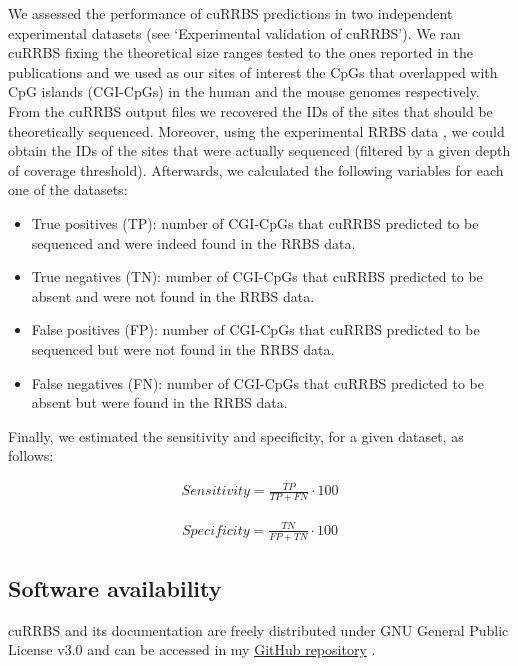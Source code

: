 We assessed the performance of cuRRBS predictions in two independent experimental datasets \cite{Tanas2017,Lim2016} (see `Experimental validation of cuRRBS'). We ran cuRRBS fixing the theoretical size ranges tested to the ones reported in the publications \cite{Tanas2017,Lim2016} and we used as our sites of interest the CpGs that overlapped with CpG islands (CGI-CpGs) in the human \cite{Tanas2017} and the mouse genomes \cite{Lim2016} respectively. From the cuRRBS output files we recovered the IDs of the sites that should be theoretically sequenced. Moreover, using the experimental RRBS data \cite{Tanas2017,Lim2016}, we could obtain the IDs of the sites that were actually sequenced (filtered by a given depth of coverage threshold). Afterwards, we calculated the following variables for each one of the datasets:

\begin{itemize}
	
	\item True positives (TP): number of CGI-CpGs that cuRRBS predicted to be sequenced and were indeed found in the RRBS data.
	
	\item True negatives (TN): number of CGI-CpGs that cuRRBS predicted to be absent and were not found in the RRBS data.
	
	\item False positives (FP): number of CGI-CpGs that cuRRBS predicted to be sequenced but were not found in the RRBS data.
	
	\item False negatives (FN): number of CGI-CpGs that cuRRBS predicted to be absent but were found in the RRBS data.
	
\end{itemize}

Finally, we estimated the sensitivity and specificity, for a given dataset, as follows:

\begin{align}
Sensitivity = \frac{TP}{TP+FN} \cdot 100
\end{align}

\begin{align}
Specificity = \frac{TN}{FP+TN} \cdot 100
\end{align}

\subsection*{Software availability}

cuRRBS and its documentation are freely distributed under GNU General Public License v3.0 and can be accessed in my \href{https://github.com/demh/cuRRBS/}{GitHub repository} \cite{Martin-Herranz2017}.
